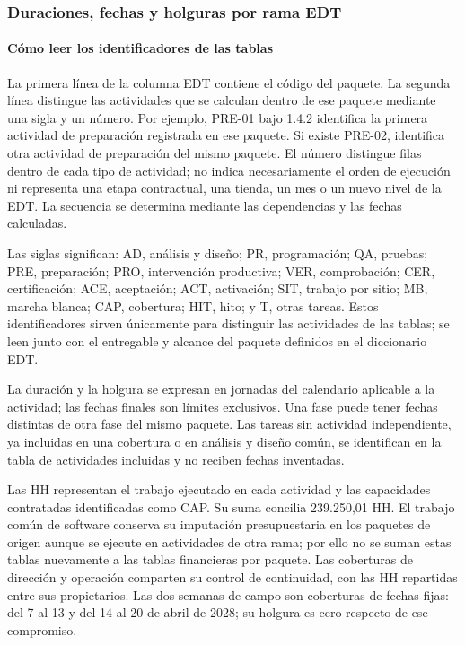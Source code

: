 \documentclass[11pt]{article}
\begin{document}
\subsubsection{Duraciones, fechas y holguras por rama EDT}

\paragraph{Cómo leer los identificadores de las tablas}

La primera línea de la columna EDT contiene el código del paquete. La segunda línea distingue las actividades que se calculan dentro de ese paquete mediante una sigla y un número. Por ejemplo, PRE-01 bajo 1.4.2 identifica la primera actividad de preparación registrada en ese paquete. Si existe PRE-02, identifica otra actividad de preparación del mismo paquete. El número distingue filas dentro de cada tipo de actividad; no indica necesariamente el orden de ejecución ni representa una etapa contractual, una tienda, un mes o un nuevo nivel de la EDT. La secuencia se determina mediante las dependencias y las fechas calculadas.

Las siglas significan: AD, análisis y diseño; PR, programación; QA, pruebas; PRE, preparación; PRO, intervención productiva; VER, comprobación; CER, certificación; ACE, aceptación; ACT, activación; SIT, trabajo por sitio; MB, marcha blanca; CAP, cobertura; HIT, hito; y T, otras tareas. Estos identificadores sirven únicamente para distinguir las actividades de las tablas; se leen junto con el entregable y alcance del paquete definidos en el diccionario EDT.

La duración y la holgura se expresan en jornadas del calendario aplicable a la actividad; las fechas finales son límites exclusivos. Una fase puede tener fechas distintas de otra fase del mismo paquete. Las tareas sin actividad independiente, ya incluidas en una cobertura o en análisis y diseño común, se identifican en la tabla de actividades incluidas y no reciben fechas inventadas.

Las HH representan el trabajo ejecutado en cada actividad y las capacidades contratadas identificadas como CAP. Su suma concilia 239.250,01 HH. El trabajo común de software conserva su imputación presupuestaria en los paquetes de origen aunque se ejecute en actividades de otra rama; por ello no se suman estas tablas nuevamente a las tablas financieras por paquete. Las coberturas de dirección y operación comparten su control de continuidad, con las HH repartidas entre sus propietarios. Las dos semanas de campo son coberturas de fechas fijas: del 7 al 13 y del 14 al 20 de abril de 2028; su holgura es cero respecto de ese compromiso.
\end{document}
